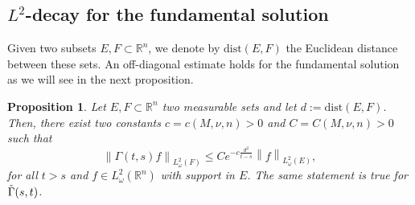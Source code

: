 \documentclass[12pt, letterpaper]{amsart}
\newtheorem{prop}[thm]{Proposition}
\theoremstyle{definition}
\theoremstyle{remark}
\numberwithin{equation}{section}
\begin{document}
\subsection{\texorpdfstring{$L^2$}{L2}-decay for the fundamental solution}
Given two subsets $E,F \subset \mathbb{R}^n$, we denote by $\mathrm{dist}(E,F)$ the Euclidean distance between these sets. An off-diagonal estimate holds for the fundamental solution as we will see in the next proposition.
\begin{prop}\label{prop:off-diagonal} Let $E,F \subset \mathbb{R}^n$ two measurable sets and let $d:=\mathrm{dist}(E,F)$. Then, there exist two constants $c=c(M,\nu,n)>0$ and $C=C(M,\nu,n)>0$ such that 
\begin{equation*}
    \left\| \Gamma(t,s)f  \right\|_{L^2_\omega(F)} \leq C e^{-c\frac{d^2}{t-s}} \left\|f \right\|_{L^2_\omega(E)},
\end{equation*}
for all $t>s$ and $f \in L^2_\omega(\mathbb{R}^n)$ with  support in $E$. The same statement is true for $\Tilde{\Gamma}(s,t)$.
\end{prop}
\end{document}
